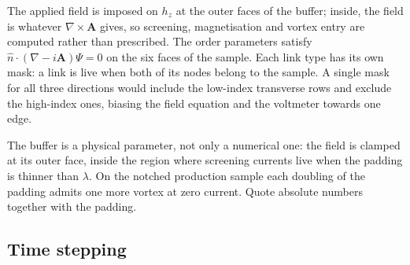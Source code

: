 \documentclass[11pt,a4paper]{article}
\begin{document}
The applied field is imposed on $h_z$ at the outer faces of the
buffer; inside, the field is whatever $\nabla\times\mathbf A$ gives, so
screening, magnetisation and vortex entry are computed rather than
prescribed. The order parameters satisfy
$\hat n\cdot(\nabla-i\mathbf A)\Psi=0$ on the six faces of the sample.
Each link type has its own mask: a link is live when both of its nodes
belong to the sample. A single mask for all three directions would include
the low-index transverse rows and exclude the high-index ones, biasing the
field equation and the voltmeter towards one edge.

The buffer is a physical parameter, not only a numerical one: the
field is clamped at its outer face, inside the region where screening
currents live when the padding is thinner than $\lambda$. On the notched
production sample each doubling of the padding admits one more vortex at
zero current. Quote absolute numbers together with the padding.

\subsection{Time stepping}
\end{document}
